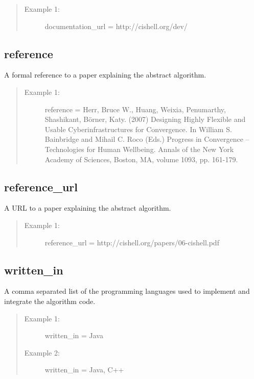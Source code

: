 \begin{quote}
\begin{description}
  \item[Example 1:] documentation\_url = http://cishell.org/dev/ 
\end{description}
\end{quote}


\subsection*{reference}
A formal reference to a paper explaining the abstract algorithm.

\begin{quote}
\begin{description}
  \item[Example 1:] reference = Herr, Bruce W., Huang, Weixia, Penumarthy,
  Shashikant, Börner, Katy. (2007) Designing Highly Flexible and Usable 
  Cyberinfrastructures for Convergence. In William S. Bainbridge and Mihail C. 
  Roco (Eds.) Progress in Convergence – Technologies for Human Wellbeing. 
  Annals of the New York Academy of Sciences, Boston, MA, volume 1093, pp. 161-179.
\end{description}
\end{quote}


\subsection*{reference\_url}
A URL to a paper explaining the abstract algorithm.

\begin{quote}
\begin{description}
  \item[Example 1:] reference\_url = http://cishell.org/papers/06-cishell.pdf 
\end{description}
\end{quote}


\subsection*{written\_in}
A comma separated list of the programming languages used to implement and
integrate the algorithm code.

\begin{quote}
\begin{description}
  \item[Example 1:] written\_in = Java
  \item[Example 2:] written\_in = Java, C++ 
\end{description}
\end{quote}

